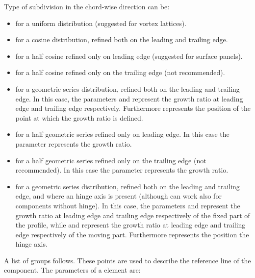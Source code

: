 \begin{itemize}
Type of subdivision in the chord-wise direction can be:   
\begin{itemize}
  \item {} for a uniform distribution (suggested for vortex lattices). 
  \item {} for a cosine distribution, refined both on the leading and trailing edge.  
  \item {} for a half cosine refined only on leading edge (suggested for surface panels). 
  \item {} for a half cosine refined only on the trailing edge (not recommended). 
  \item {} for a geometric series distribution, refined both on the leading and trailing edge.
  In this case, the parameters  and  represent the growth ratio at leading edge and 
  trailing edge respectively. Furthermore  represents the position of the point at which
  the growth ratio is defined.
  \item {} for a half geometric series refined only on leading edge. 
  In this case the parameter  represents the growth ratio.
  \item {} for a half geometric series refined only on the trailing edge (not recommended).
  In this case the parameter  represents the growth ratio.
  \item {} for a geometric series distribution, refined both on the leading and trailing edge, 
  and where an hinge axis is present (although can work also for components without hinge). 
  In this case, the parameters  and  represent the growth ratio at leading edge and
  trailing edge respectively of the fixed part of the profile, while  and  
  represent the growth ratio at leading edge and trailing edge respectively of the moving part. 
  Furthermore  represents the position the hinge axis. 
\end{itemize}


\end{itemize}
%
A list of  groups follows. These points are used to 
describe the reference line of the component. The parameters of a 
 element are:
